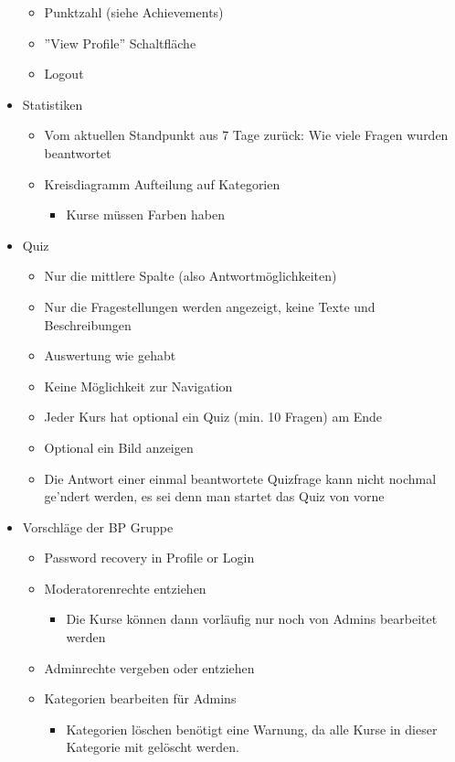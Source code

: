 \documentclass[colorback, accentcolor=tud1c, paper=a4]{tudexercise}
\begin{document}
\begin{multicols}{2}
\begin{itemize}
\begin{itemize}
		\item Punktzahl (siehe Achievements)
		\item ''View Profile'' Schaltfläche
		\item Logout
	\end{itemize}
	\item Statistiken
	\begin{itemize}
		\item Vom aktuellen Standpunkt aus 7 Tage zurück: Wie viele Fragen wurden beantwortet
		\item Kreisdiagramm Aufteilung auf Kategorien
		\begin{itemize}
			\item Kurse müssen Farben haben
		\end{itemize}
	\end{itemize}
	\item Quiz
	\begin{itemize}
		\item Nur die mittlere Spalte (also Antwortmöglichkeiten)
		\item Nur die Fragestellungen werden angezeigt, keine Texte und Beschreibungen
		\item Auswertung wie gehabt
		\item Keine Möglichkeit zur Navigation
		\item Jeder Kurs hat optional ein Quiz (min. 10 Fragen) am Ende
		\item Optional ein Bild anzeigen 
		\item Die Antwort einer einmal beantwortete Quizfrage kann nicht nochmal ge'ndert werden, es sei denn man startet das Quiz von vorne
	\end{itemize}
	\item Vorschläge der BP Gruppe
	\begin{itemize}
		\item Password recovery in Profile or Login
		\item Moderatorenrechte entziehen
		\begin{itemize}
			\item Die Kurse können dann vorläufig nur noch von Admins bearbeitet werden 
		\end{itemize}
		\item Adminrechte vergeben oder entziehen
		\item Kategorien bearbeiten für Admins
		\begin{itemize}
			\item Kategorien löschen benötigt eine Warnung, da alle Kurse in dieser Kategorie mit gelöscht werden.

\end{itemize}
\end{itemize}
\end{itemize}
\end{multicols}
\end{document}
